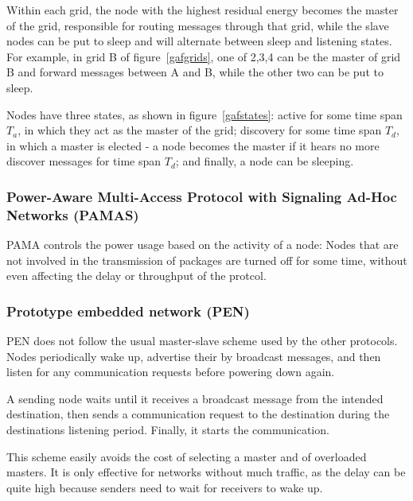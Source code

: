 \documentclass[conference]{IEEEtran}
\begin{document}
Within each grid, the node with the highest residual energy becomes the master
of the grid, responsible for routing messages through that grid, while the
slave nodes can be put to sleep and will alternate between sleep and listening
states. For example, in grid B of figure~\ref{gafgrids}, one of 2,3,4 can be the
master of grid B and forward messages between A and B, while the other two can
be put to sleep.

Nodes have three states, as shown in figure~\ref{gafstates}: active for some time span $T_{a}$, in which they
act as the master of the grid; discovery for some time span $T_{d}$, in which a
master is elected - a node becomes the master if it hears no more discover messages
for time span $T_{d}$; and finally, a node can be sleeping.




\subsubsection{Power-Aware Multi-Access Protocol with Signaling Ad-Hoc Networks (PAMAS)}
PAMA\cite{singh1998pamas} controls the power usage based on the activity of
a node: Nodes that are not involved in the transmission of packages are turned
off for some time, without even affecting the delay or throughput of the
protcol.\cite{singh1998pamas} 


\subsubsection{Prototype embedded network (PEN)}
PEN\cite{girling2000design} does not follow the usual master-slave scheme
used by the other protocols. Nodes periodically wake up, advertise their
by broadcast messages, and then listen for any communication requests before
powering down again.

A sending node waits until it receives a broadcast message from the intended
destination, then sends a communication request to the destination during
the destinations listening period. Finally, it starts the communication.

This scheme easily avoids the cost of selecting a master and of overloaded
masters. It is only effective for networks without much traffic, as the delay
can be quite high because senders need to wait for receivers to wake up.
\end{document}
